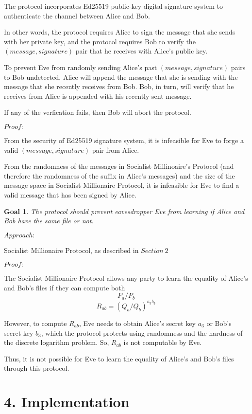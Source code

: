 \documentclass{article}
\newtheorem{goal}{Goal}
\begin{document}
The protocol incorporates Ed25519 public-key digital signature system to authenticate 
the channel between Alice and Bob. 

In other words, the protocol requires Alice to sign 
the message that she sends with her private key, and the protocol requires Bob to 
verify the $(message, signature)$ pair that he receives with Alice's public key.

To prevent Eve from randomly sending Alice's past $(message, signature)$ pairs 
to Bob undetected, Alice will append the message that she is sending with the 
message that she recently receives from Bob. Bob, in turn, will verify that he 
receives from Alice is appended with his recently sent message.

If any of the verfication fails, then Bob will abort the protocol.

$Proof:$

From the security of Ed25519 signature system, it is infeasible for Eve to 
forge a valid $(message, signature)$ pair from Alice.

From the randomness of the messages in Socialist Millinoaire's Protocol (and therefore 
the randomness of the suffix in Alice's messages) and the size of the message space in 
Socialist Millionaire Protocol, it is infeasible for Eve to find a valid message 
that has been signed by Alice.

\begin{goal}
The protocol should prevent eavesdropper Eve from learning if Alice and Bob have the 
same file or not.
\end{goal}

$Approach:$ 

Socialist Millionaire Protocol, as described in $Section\ 2$

$Proof:$

The Socialist Millionaire Protocol allows any party to learn the equality of 
Alice's and Bob's files if they can compute both
$$P_a / P_b$$ $$R_{ab} = (Q_a/Q_b)^{a_3b_3}$$

However, to compute $R_{ab}$, Eve needs to obtain Alice's secret key $a_3$
or Bob's secret key $b_3$, which the protocol protects using randomness and 
the hardness of the discrete logarithm problem. So, $R_{ab}$ is not computable
by Eve.

Thus, it is not possible for Eve to learn the equality of Alice's and Bob's files 
through this protocol.

\section*{4. Implementation}
\end{document}
